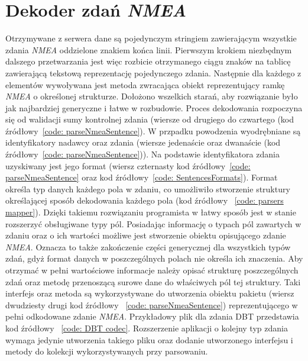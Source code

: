 \documentclass[skorowidz,skroty]{dyplomWEZUT}
\begin{document}
\section{Dekoder zdań \textit{NMEA}}\label{sec: NMEA parser}
Otrzymywane z serwera dane są pojedynczym stringiem zawierającym wszystkie zdania \textit{NMEA} oddzielone znakiem końca linii. Pierwszym krokiem niezbędnym dalszego przetwarzania jest więc rozbicie otrzymanego ciągu znaków na tablicę zawierającą tekstową reprezentację pojedynczego zdania. Następnie dla każdego z elementów wywoływana jest metoda zwracająca obiekt reprezentujący ramkę \textit{NMEA} o określonej strukturze. Dołożono wszelkich starań, aby rozwiązanie było jak najbardziej generyczne i łatwe w rozbudowie. Proces dekodowania rozpoczyna się od walidacji sumy kontrolnej zdania (wiersze od drugiego do czwartego (kod źródłowy~\ref{code: parseNmeaSentence}). W przpadku powodzenia wyodrębniane są identyfikatory nadawcy oraz zdania (wiersze jedenaście oraz dwanaście (kod źródłowy~\ref{code: parseNmeaSentence})). Na podstawie identyfikatora zdania uzyskiwany jest jego format (wiersz czternasty kod źródłowy~\ref{code: parseNmeaSentence} oraz kod źródłowy~\ref{code: SentencesFormats}). Format określa typ danych każdego pola w zdaniu, co umożliwiło stworzenie struktury określającej sposób dekodowania każdego pola (kod źródłowy ~\ref{code: parsers mapper}). Dzięki takiemu rozwiązaniu programista w łatwy sposób jest w stanie rozszerzyć obsługiwane typy pól. Posiadając informację o typach pól zawartych w zdaniu oraz o ich wartości możliwe jest stworzenie obiektu opisującego zdanie \textit{NMEA}. Oznacza to także zakończenie części generycznej dla wszystkich typów zdań, gdyż format danych w poszczególnych polach nie określa ich znaczenia. Aby otrzymać w pełni wartościowe informacje należy opisać strukturę poszczególnych zdań oraz metodę przenoszącą surowe dane do właściwych pól tej struktury. Taki interfejs oraz metoda są wykorzystywane do utworzenia obiektu pakietu (wiersz dwudziesty drugi kod źródłowy ~\ref{code: parseNmeaSentence}) reprezentującego w pełni odkodowane zdanie \textit{NMEA}. Przykładowy plik dla zdania DBT przedstawia kod źródłowy ~\ref{code: DBT codec}. Rozszerzenie aplikacji o kolejny typ zdania wymaga jedynie utworzenia takiego pliku oraz dodanie utworzonego interfejsu i metody do kolekcji wykorzystywanych przy parsowaniu.
\end{document}
